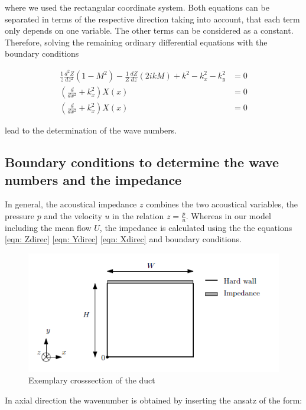 \documentclass[11pt]{report} %
\begin{document}
where we used the rectangular coordinate system.
Both equations can be separated in terms of the respective direction taking into account, that each term only depends on one variable. 
The other terms can be considered as a constant. 
Therefore,  solving the remaining ordinary differential equations with the boundary conditions

\begin{subequations}
\begin{align}
\frac{1}{z}\frac{d^2Z}{dz^2}(1-M^2)-\frac{1}{Z}\frac{dZ}{dz}(2ikM)+k^2-k_x^2-k_y^2&=0 \label{eqn: Zdirec} \\
\left( \frac{d}{dx^2}+k_x^2\right)X(x)&=0 \label{eqn: Ydirec} \\
\left( \frac{d}{dx^2}+k_x^2\right)X(x)&=0 \label{eqn: Xdirec}
\end{align}
\end{subequations} 

lead to the determination of the wave numbers.   

\subsection{Boundary conditions to determine the wave numbers and the impedance}
In general, the acoustical impedance $z$ combines the two acoustical variables, the pressure $p$ and the velocity $u$ in the relation $z=\frac{p}{u}$. 
Whereas in our model including the mean flow $U$, the impedance is calculated using the the equations \ref{eqn: Zdirec} \ref{eqn: Ydirec} \ref{eqn: Xdirec} and boundary conditions. 

\begin{figure}[H]
\centering
\includegraphics[scale=0.8]{./Figures/Boundary}
\caption{Exemplary crosssection of the duct}
\end{figure}

In axial direction the wavenumber is obtained by inserting the ansatz of the form: 
\end{document}
